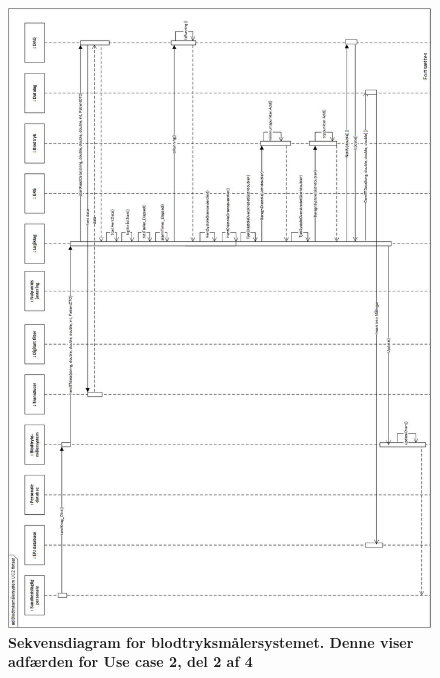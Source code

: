 \begin{figure}[H]
\includegraphics[width =1.0\textwidth , center]{billeder/sdUC2_2}
\caption{\textbf{Sekvensdiagram for blodtryksmålersystemet. Denne viser adfærden for Use case 2, del 2 af 4}}
\end{figure}
